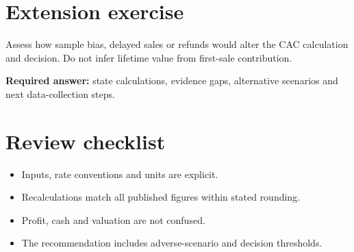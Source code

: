 \documentclass[11pt]{article}
\begin{document}
\section{Extension exercise}
Assess how sample bias, delayed sales or refunds would alter the CAC calculation and decision. Do not infer lifetime value from first-sale contribution.\par\textbf{Required answer:} state calculations, evidence gaps, alternative scenarios and next data-collection steps.
\section{Review checklist}
\begin{itemize}[leftmargin=*,itemsep=3pt]
\item Inputs, rate conventions and units are explicit.
\item Recalculations match all published figures within stated rounding.
\item Profit, cash and valuation are not confused.
\item The recommendation includes adverse-scenario and decision thresholds.
\end{itemize}
\end{document}
